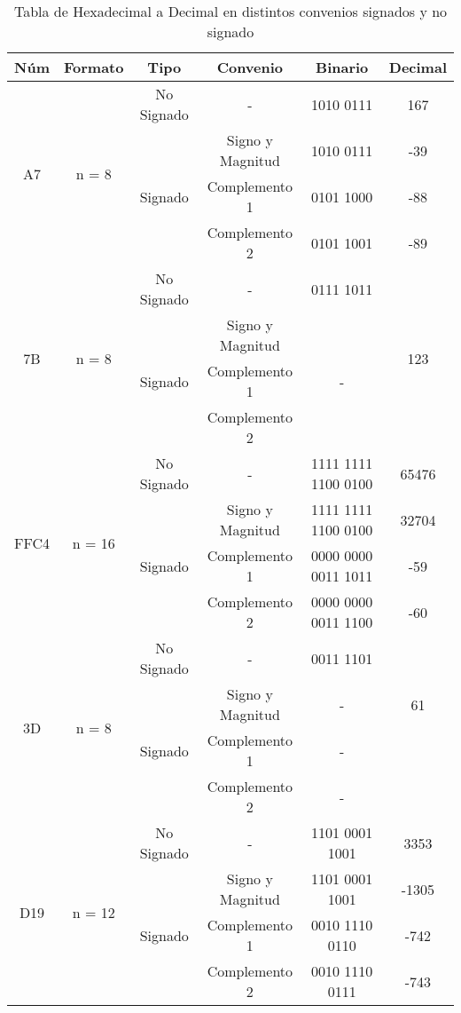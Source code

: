 \documentclass[12pt]{article}
\begin{document}
\begin{table}[h!]
  \centering
  \begin{tabular}{|c|c|c|c|c|c|}
  \hline
  \textbf{Núm} & \textbf{Formato} & \textbf{Tipo} & \textbf{Convenio} & \textbf{Binario} & \textbf{Decimal}\\
  \hline
  \multirow{4}{*}{A7} & \multirow{4}{*}{n = 8}& No Signado & - & 1010 0111 & 167\\\cline{3-6}
  & & \multirow{3}{*}{Signado} & Signo y Magnitud & 1010 0111 & -39 \\\cline{4-6}
  & &  & Complemento 1  & 0101 1000 & -88\\\cline{4-6}
  & &  & Complemento 2  & 0101 1001 & -89\\\hline
  \multirow{4}{*}{7B} & \multirow{4}{*}{n = 8}& No Signado & - & 0111 1011 & \multirow{4}{*}{123}\\\cline{3-5}
  & & \multirow{3}{*}{Signado}& Signo y Magnitud &\multirow{3}{*}{-} & \\\cline{4-4}
  & &  & Complemento 1  &  & \\\cline{4-4}
  & &  & Complemento 2  &  & \\\hline
  \multirow{4}{*}{FFC4} & \multirow{4}{*}{n = 16}& No Signado & - & 1111 1111 1100 0100 & 65476\\\cline{3-6}
  & & \multirow{3}{*}{Signado} & Signo y Magnitud & 1111 1111 1100 0100 & 32704 \\\cline{4-6}
  & &  & Complemento 1  & 0000 0000 0011 1011 & -59\\\cline{4-6}
  & &  & Complemento 2  & 0000 0000 0011 1100 & -60\\\hline
  \multirow{4}{*}{3D} & \multirow{4}{*}{n = 8}& No Signado & - & 0011 1101 & \multirow{3}{*}{61} \\\cline{3-5}
  & & \multirow{3}{*}{Signado} & Signo y Magnitud & - &\\\cline{4-5}
  & &  & Complemento 1  & - & \\\cline{4-5}
  & &  & Complemento 2  & - & \\\hline
  \multirow{4}{*}{D19} & \multirow{4}{*}{n = 12}& No Signado & - & 1101 0001 1001 & 3353\\\cline{3-6}
  & & \multirow{3}{*}{Signado} & Signo y Magnitud & 1101 0001 1001 & -1305 \\\cline{4-6}
  & &  & Complemento 1  & 0010 1110 0110 & -742\\\cline{4-6}
  & &  & Complemento 2  & 0010 1110 0111 & -743\\\hline
  \end{tabular}
  \caption{Tabla de Hexadecimal a Decimal en distintos convenios signados y no signado}
\end{table}
\end{document}
